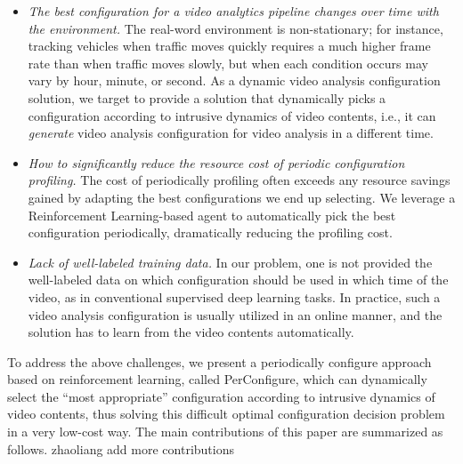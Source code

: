 \begin{itemize}	
\item \emph{The best configuration for a video analytics pipeline changes over time with the environment.} The real-word environment is non-stationary; for instance, tracking vehicles when traffic moves quickly requires a much higher frame rate than when traffic moves slowly, but when each condition occurs may vary by hour, minute, or second. As a dynamic video analysis configuration solution, we target to provide a solution that dynamically picks a configuration according to intrusive dynamics of video contents, i.e., it can \emph{generate} video analysis configuration for video analysis in a different time.

\item \emph{How to significantly reduce the resource cost of periodic configuration profiling.} The cost of periodically profiling often exceeds any resource savings gained by adapting the best configurations we end up selecting. We leverage a Reinforcement Learning-based agent to automatically pick the best configuration periodically, dramatically reducing the profiling cost. 

\item \emph{Lack of well-labeled training data.} In our problem, one is not provided the well-labeled data on which configuration should be used in which time of the video, as in conventional supervised deep learning tasks. In practice, such a video analysis configuration is usually utilized in an online manner, and the solution has to learn from the video contents automatically. 
\end{itemize}

To address the above challenges, we present a periodically configure approach based on reinforcement learning, called PerConfigure, which can dynamically select the ``most appropriate'' configuration according to intrusive dynamics of video contents, thus solving this difficult optimal configuration decision problem in a very low-cost way. The main contributions of this paper are summarized as follows.
\textcolor{note}{zhaoliang add more contributions}

